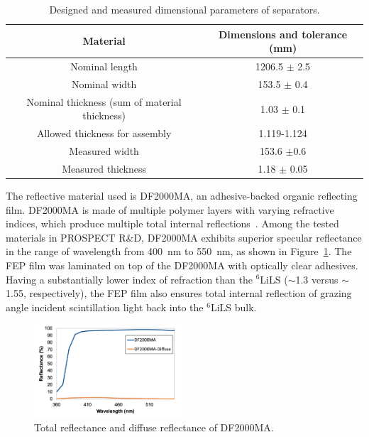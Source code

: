 \begin{table}[htpb]
\centering
\caption{Designed and measured dimensional parameters of separators.}
\begin{tabular}{cc}
\hline
\hline 
Material & Dimensions and tolerance (mm) \\ \hline 
Nominal length & 1206.5 $\pm$ 2.5 \\
Nominal width & 153.5 $\pm$ 0.4 \\
Nominal thickness (sum of material thickness)  & 1.03 $\pm$ 0.1 \\ 
Allowed thickness for assembly  & 1.119-1.124 \\ \hline
Measured width & 153.6 $\pm $0.6 \\
Measured thickness & 1.18 $\pm$ 0.05 \\
\hline
\end{tabular}
\label{tab:separator_dimension}
\end{table}

The reflective material used is DF2000MA, an adhesive-backed organic reflecting film.
DF2000MA is made of multiple polymer layers with varying refractive indices, which produce multiple total internal reflections~\cite{bib:ESR_science}.
Among the tested materials in PROSPECT R\&D, DF2000MA exhibits superior specular reflectance in the range of wavelength from 400~nm to 550~nm, as shown in Figure~\ref{fig:refcomp}.
The FEP film was laminated on top of the DF2000MA with optically clear adhesives.
Having a substantially lower index of refraction than the $^{6}$LiLS ($\sim$1.3 versus $\sim$1.55, respectively), the FEP film also ensures total internal reflection of grazing angle incident scintillation light back into the $^{6}$LiLS bulk.  

\begin{figure}[h!]
\centering
\includegraphics[trim = 0mm 0cm 0cm 0cm, clip, width=0.49\textwidth]{Figures/ReflectorCompare.png}
\caption[Reflectance measurement of DF2000MA]{Total reflectance and diffuse reflectance of DF2000MA.}
\label{fig:refcomp}
\end{figure}

